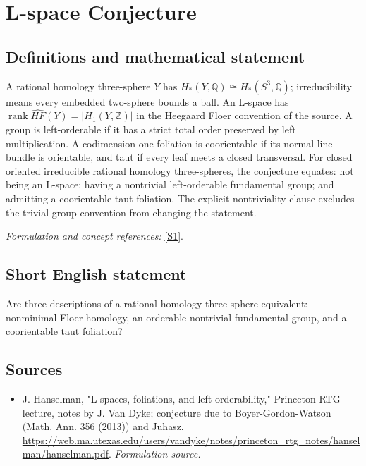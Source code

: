 \documentclass[11pt]{article}
\begin{document}
\section*{\texorpdfstring{L-space Conjecture}{L-space Conjecture}}\label{181}
\subsection{Definitions and mathematical statement}
A rational homology three-sphere $Y$ has $H_*(Y,{\mathbb{Q}})\cong H_*(S^3,{\mathbb{Q}})$; irreducibility means every embedded two-sphere bounds a ball. An L-space has
$\operatorname{rank}\widehat{HF}(Y)=|H_1(Y,{\mathbb{Z}})|$ in the Heegaard Floer convention of the source. A group is left-orderable if it has a strict total order preserved by left multiplication. A codimension-one foliation is coorientable if its normal line bundle is orientable, and taut if every leaf meets a closed transversal. For closed oriented irreducible rational homology three-spheres, the conjecture equates: not being an L-space; having a nontrivial left-orderable fundamental group; and admitting a coorientable taut foliation. The explicit nontriviality clause excludes the trivial-group convention from changing the statement.
\par\smallskip\textit{Formulation and concept references:} \href{https://web.ma.utexas.edu/users/vandyke/notes/princeton_rtg_notes/hanselman/hanselman.pdf}{[S1]}.

\subsection{Short English statement}
Are three descriptions of a rational homology three-sphere equivalent: nonminimal Floer homology, an orderable nontrivial fundamental group, and a coorientable taut foliation?
\subsection{Sources}
\begin{itemize}
\item[S1]J. Hanselman, "L-spaces, foliations, and left-orderability," Princeton RTG lecture, notes by J. Van Dyke; conjecture due to Boyer-Gordon-Watson (Math. Ann. 356 (2013)) and Juhasz.
\url{https://web.ma.utexas.edu/users/vandyke/notes/princeton_rtg_notes/hanselman/hanselman.pdf}.
\textit{Formulation source.}
\end{itemize}
\end{document}
